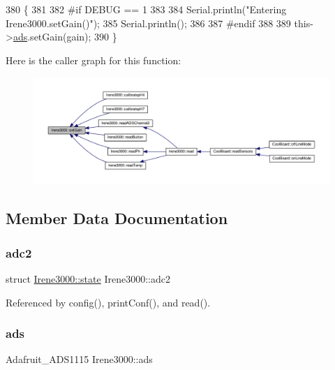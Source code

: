 \begin{DoxyCode}
380 \{
381 
382 \textcolor{preprocessor}{#if DEBUG == 1  }
383 
384     Serial.println(\textcolor{stringliteral}{"Entering Irene3000.setGain()"});
385     Serial.println();
386 
387 \textcolor{preprocessor}{#endif}
388 
389     this->\hyperlink{classIrene3000_a1215e77ba761c9908d80d691f149e135}{ads}.setGain(gain);
390 \}
\end{DoxyCode}
Here is the caller graph for this function\+:\nopagebreak
\begin{figure}[H]
\begin{center}
\leavevmode
\includegraphics[width=350pt]{classIrene3000_aff7c5da186b388e7272e63ff88a20c34_icgraph}
\end{center}
\end{figure}


\subsection{Member Data Documentation}
\mbox{\label{classIrene3000_aae3a95a1c83c766cd2f299ce471c337e}} 
\subsubsection{\texorpdfstring{adc2}{adc2}}
{\footnotesize\ttfamily struct \hyperlink{structIrene3000_1_1state}{Irene3000\+::state} Irene3000\+::adc2\hspace{0.3cm}{\ttfamily [private]}}



Referenced by config(), print\+Conf(), and read().

\mbox{\label{classIrene3000_a1215e77ba761c9908d80d691f149e135}} 
\subsubsection{\texorpdfstring{ads}{ads}}
{\footnotesize\ttfamily Adafruit\+\_\+\+A\+D\+S1115 Irene3000\+::ads\hspace{0.3cm}{\ttfamily [private]}}



